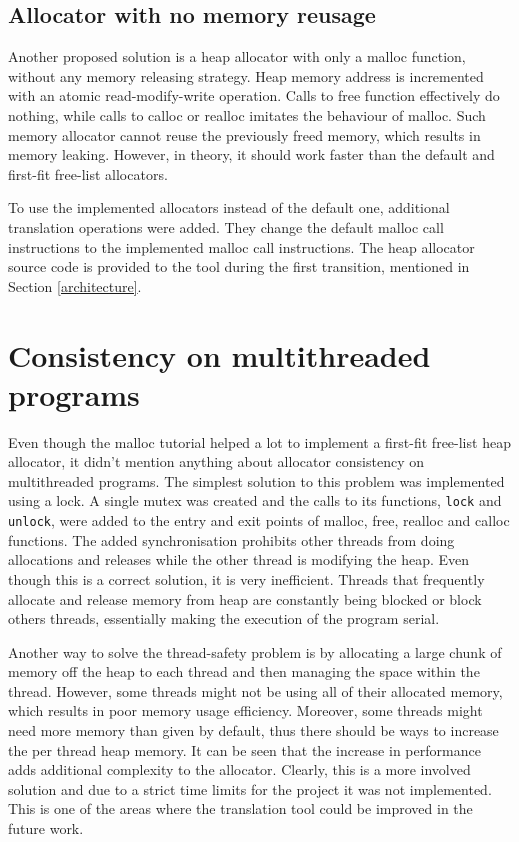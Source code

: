 \documentclass[bsc,frontabs,twoside,singlespacing,parskip,deptreport]{infthesis}     %
\begin{document}
\subsection{Allocator with no memory reusage}

Another proposed solution is a heap allocator with only a malloc function, without any memory releasing strategy. Heap memory address is incremented with an atomic read-modify-write operation. Calls to free function effectively do nothing, while calls to calloc or realloc imitates the behaviour of malloc. Such memory allocator cannot reuse the previously freed memory, which results in memory leaking. However, in theory, it should work faster than the default and first-fit free-list allocators.

To use the implemented allocators instead of the default one, additional translation operations were added. They change the default malloc call instructions to the implemented malloc call instructions. The heap allocator source code is provided to the tool during the first transition, mentioned in Section \ref{architecture}.

\section{Consistency on multithreaded programs}
\label{consistency}
Even though the malloc tutorial helped a lot to implement a first-fit free-list heap allocator, it didn't mention anything about allocator consistency on multithreaded programs. The simplest solution to this problem was implemented using a lock. A single mutex was created and the calls to its functions, \texttt{lock} and \texttt{unlock}, were added to the entry and exit points of malloc, free, realloc and calloc functions. The added synchronisation prohibits other threads from doing allocations and releases while the other thread is modifying the heap. Even though this is a correct solution, it is very inefficient. Threads that frequently allocate and release memory from heap are constantly being blocked or block others threads, essentially making the execution of the program serial.

Another way to solve the thread-safety problem is by allocating a large chunk of memory off the heap to each thread and then managing the space within the thread. However, some threads might not be using all of their allocated memory, which results in poor memory usage efficiency. Moreover, some threads might need more memory than given by default, thus there should be ways to increase the per thread heap memory. It can be seen that the increase in performance adds additional complexity to the allocator. Clearly, this is a more involved solution and due to a strict time limits for the project it was not implemented. This is one of the areas where the translation tool could be improved in the future work.
\end{document}
